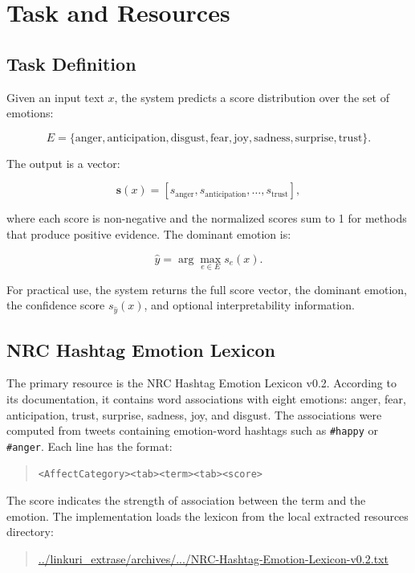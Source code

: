 \section{Task and Resources}

\subsection{Task Definition}

Given an input text $x$, the system predicts a score distribution over the set of emotions:

\[
E = \{\text{anger}, \text{anticipation}, \text{disgust}, \text{fear}, \text{joy}, \text{sadness}, \text{surprise}, \text{trust}\}.
\]

The output is a vector:

\[
\mathbf{s}(x) = [s_{\text{anger}}, s_{\text{anticipation}}, \ldots, s_{\text{trust}}],
\]

where each score is non-negative and the normalized scores sum to 1 for methods that produce positive evidence. The dominant emotion is:

\[
\hat{y} = \arg\max_{e \in E} s_e(x).
\]

For practical use, the system returns the full score vector, the dominant emotion, the confidence score $s_{\hat{y}}(x)$, and optional interpretability information.

\subsection{NRC Hashtag Emotion Lexicon}

The primary resource is the NRC Hashtag Emotion Lexicon v0.2. According to its documentation, it contains word associations with eight emotions: anger, fear, anticipation, trust, surprise, sadness, joy, and disgust. The associations were computed from tweets containing emotion-word hashtags such as \texttt{\#happy} or \texttt{\#anger}. Each line has the format:

\begin{quote}
\texttt{<AffectCategory><tab><term><tab><score>}
\end{quote}

The score indicates the strength of association between the term and the emotion. The implementation loads the lexicon from the local extracted resources directory:

\begin{quote}
\small
\url{../linkuri_extrase/archives/.../NRC-Hashtag-Emotion-Lexicon-v0.2.txt}
\end{quote}

